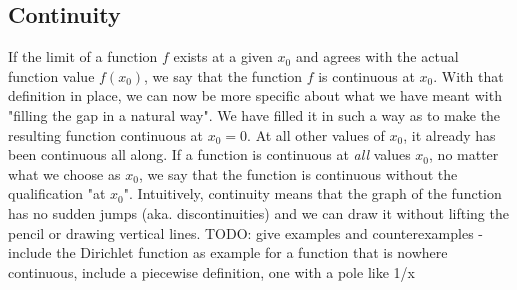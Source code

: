 \subsection{Continuity}
If the limit of a function $f$ exists at a given $x_0$ and agrees with the actual function value $f(x_0)$, we say that the function $f$ is continuous at $x_0$. With that definition in place, we can now be more specific about what we have meant with "filling the gap in a natural way". We have filled it in such a way as to make the resulting function continuous at $x_0 = 0$. At all other values of $x_0$, it already has been continuous all along. If a function is continuous at \emph{all} values $x_0$, no matter what we choose as $x_0$, we say that the function is continuous without the qualification "at $x_0$". Intuitively, continuity means that the graph of the function has no sudden jumps (aka. discontinuities) and we can draw it without lifting the pencil or drawing vertical lines. TODO: give examples and counterexamples - include the Dirichlet function as example for a function that is nowhere continuous, include a piecewise definition, one with a pole like 1/x











